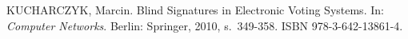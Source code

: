 \begin{thebibliography}{1}

KUCHARCZYK, Marcin. Blind Signatures in Electronic Voting Systems. In: \textit{Computer Networks}. Berlin: Springer, 2010, s.~349-358. ISBN 978-3-642-13861-4.

\end{thebibliography}
